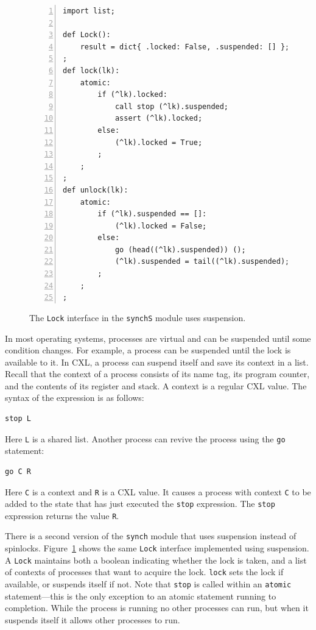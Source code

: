 \documentclass{report}
\newenvironment{code}{
\tcolorbox
}{
\endtcolorbox
}
\begin{document}
\begin{figure}
\begin{code}
\begin{Verbatim}[xleftmargin=5mm,numbers=left]
import list;

def Lock():
    result = dict{ .locked: False, .suspended: [] };
;
def lock(lk):
    atomic:
        if (^lk).locked:
            call stop (^lk).suspended;
            assert (^lk).locked;
        else:
            (^lk).locked = True;
        ;
    ;
;
def unlock(lk):
    atomic:
        if (^lk).suspended == []:
            (^lk).locked = False;
        else:
            go (head((^lk).suspended)) ();
            (^lk).suspended = tail((^lk).suspended);
        ;
    ;
;
\end{Verbatim}
\end{code}
\caption{The \texttt{Lock} interface in the \texttt{synchS} module uses suspension.}
\label{fig:suspension}
\end{figure}

In most operating systems, processes are virtual and can be suspended
until some condition changes.  For example, a process can be suspended
until the lock is available to it.
In CXL, a process can suspend itself and save its context in a
list.  Recall that the context of a process consists of its name tag,
its program counter, and the contents of its register and stack.
A context is a regular CXL value.
The syntax of the expression is as follows:

\begin{code}
\begin{verbatim}
stop L
\end{verbatim}
\end{code}

Here \texttt{L} is a shared list.
Another process can revive the process using the \texttt{go}
statement:

\begin{code}
\begin{verbatim}
go C R
\end{verbatim}
\end{code}

Here \texttt{C} is a context and \texttt{R} is a CXL value.
It causes a process with context \texttt{C} to be added to the state that has
just executed the \texttt{stop}
expression.  The \texttt{stop} expression returns the value \texttt{R}.

There is a second version of the \texttt{synch} module that uses suspension
instead of spinlocks.
Figure~\ref{fig:suspension} shows the same \texttt{Lock} interface implemented
using suspension.
A \texttt{Lock} maintains both a boolean indicating whether the lock is taken,
and a list of contexts of processes that want to acquire the lock.
\texttt{lock} sets the lock if available, or suspends itself if not.
Note that \texttt{stop} is called within an \texttt{atomic} statement---this is
the only exception to an atomic statement running to completion.  While the
process is running no other processes can run, but when it suspends itself
it allows other processes to run.
\end{document}
